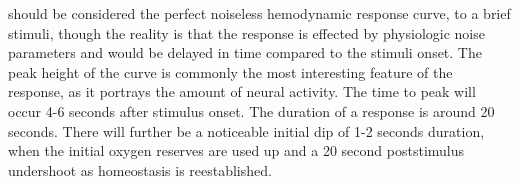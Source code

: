  should be considered the perfect noiseless hemodynamic response curve, to a brief stimuli, though the reality is that the response is effected by physiologic noise parameters and would be delayed in time compared to the stimuli onset. The peak height of the curve is commonly the most interesting feature of the response, as it portrays the amount of neural activity. The time to peak will occur 4-6 seconds after stimulus onset. The duration of a response is around 20 seconds. There will further be a noticeable initial dip of 1-2 seconds duration, when the initial oxygen reserves are used up and a 20 second poststimulus undershoot as homeostasis is reestablished. \cite{Poldrack2011}   